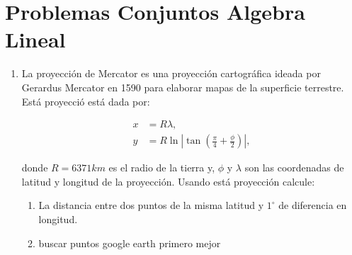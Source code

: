 \documentclass{article}
\begin{document}
\section{Problemas Conjuntos Algebra Lineal}
\begin{enumerate}


\item La proyección de Mercator es una proyección cartográfica ideada por Gerardus Mercator en 1590 para elaborar mapas de la superficie terrestre. Está proyecció está dada por:

\begin{align*}
x&=R\lambda, \\
y&=R\ln\left|\tan\left(\frac{\pi}{4}+\frac{\phi}{2}\right)\right|,
\end{align*}

donde $R=6371km$ es el radio de la tierra y, $\phi$ y  $\lambda$ son las coordenadas de latitud y longitud de la proyección. Usando está proyección calcule:

\begin{enumerate}
\item La distancia entre dos puntos de la misma latitud y $1^{\circ}$ de diferencia en longitud.
\item buscar puntos google earth primero mejor
\end{enumerate}
\end{enumerate}
\end{document}

